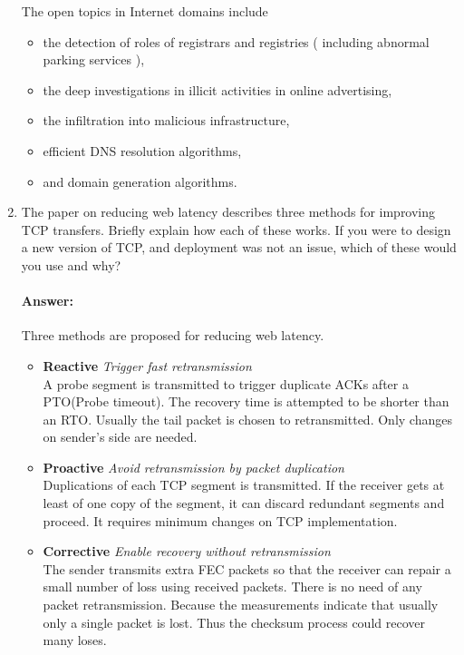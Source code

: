 \documentclass[a4paper,11pt]{article}
\theoremstyle{mytheor}
\begin{document}
\begin{enumerate}
The open topics in Internet domains include
\begin{itemize}
\item the detection of roles of registrars and registries ( including abnormal parking services ),
\item the deep investigations in illicit activities in online advertising,
\item the infiltration into malicious infrastructure,
\item efficient DNS resolution algorithms,
\item and domain generation algorithms.
\end{itemize}
\begin{comment}
\item 
The paper on SSL, HTTPS, and trust models describes a number of flaws with our system for secure communication. 
Choose three of these you feel are most important. 
Describe the aw and explain why this is a critical area where improvement is needed.
\paragraph{Answer:}
xx
\end{comment}

\item
The paper on reducing web latency describes three methods for improving TCP transfers. 
Briefly explain how each of these works. 
If you were to design a new version of TCP, and deployment was not an issue, which of these would you use and why?
\paragraph{Answer:}
Three methods are proposed for reducing web latency.
\begin{itemize}
\item \textbf{Reactive} \emph{Trigger fast retransmission} \\
A probe segment is transmitted to trigger duplicate ACKs after a PTO(Probe timeout).
The recovery time is attempted to be shorter than an RTO.
Usually the tail packet is chosen to retransmitted.
Only changes on sender's side are needed.
\item \textbf{Proactive} \emph{Avoid retransmission by packet duplication} \\
Duplications of each TCP segment is transmitted.
If the receiver gets at least of one copy of the segment, it can discard redundant segments and proceed.
It requires minimum changes on TCP implementation.
\item \textbf{Corrective} \emph{Enable recovery without retransmission} \\
The sender transmits extra FEC packets so that the receiver can repair a small number of loss using received packets.
There is no need of any packet retransmission.
Because the measurements indicate that usually only a single packet is lost.
Thus the checksum process could recover many loses.
\end{itemize}


\end{enumerate}
\end{document}
